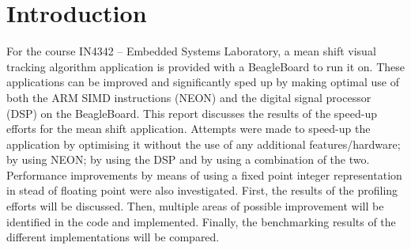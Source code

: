 \documentclass[final]{article}
\begin{document}
\section{Introduction}
For the course IN4342 -- Embedded Systems Laboratory, a mean shift visual tracking algorithm application is provided with a BeagleBoard to run it on.
These applications can be improved and significantly sped up by making optimal use of both the ARM SIMD instructions (NEON) and the digital signal processor (DSP) on the BeagleBoard.
This report discusses the results of the speed-up efforts for the mean shift application.
Attempts were made to speed-up the application by optimising it without the use of any additional features/hardware; by using NEON; by using the DSP and by using a combination of the two.
Performance improvements by means of using a fixed point integer representation in stead of floating point were also investigated.
First, the results of the profiling efforts will be discussed.
Then, multiple areas of possible improvement will be identified in the code and implemented.
Finally, the benchmarking results of the different implementations will be compared.
\end{document}
